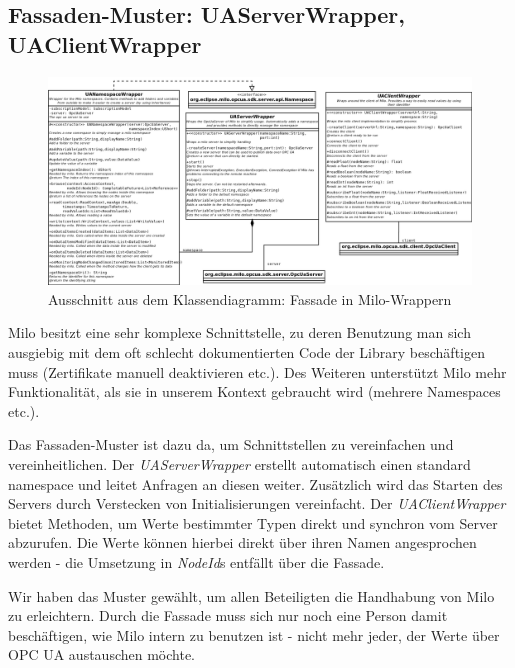 \documentclass[parskip=full]{scrartcl}
\begin{document}
\pagebreak
\subsection{Fassaden-Muster: UAServerWrapper, UAClientWrapper}
\begin{figure}[H]
  \centering
  \includegraphics[scale=0.3]{design/pattern-screenshots/fascade-UAWrapper.png}
  \caption{Ausschnitt aus dem Klassendiagramm: Fassade in Milo-Wrappern}
\end{figure}
Milo besitzt eine sehr komplexe Schnittstelle, zu deren Benutzung man sich ausgiebig mit dem oft schlecht dokumentierten Code
der Library beschäftigen muss (Zertifikate manuell deaktivieren etc.). Des Weiteren unterstützt Milo mehr Funktionalität,
als sie in unserem Kontext gebraucht wird (mehrere Namespaces etc.).

Das Fassaden-Muster ist dazu da, um Schnittstellen zu vereinfachen und vereinheitlichen.
Der \emph{UAServerWrapper} erstellt automatisch einen standard namespace und leitet Anfragen an
diesen weiter. Zusätzlich wird das Starten des Servers durch Verstecken von Initialisierungen vereinfacht. Der \emph{UAClientWrapper}
bietet Methoden, um Werte bestimmter Typen direkt und synchron vom Server abzurufen. Die Werte können hierbei direkt über ihren
Namen angesprochen werden - die Umsetzung in \emph{NodeId}s entfällt über die Fassade.

Wir haben das Muster gewählt, um allen
Beteiligten die Handhabung von Milo zu erleichtern. Durch die Fassade muss sich nur noch eine Person damit beschäftigen, wie
Milo intern zu benutzen ist - nicht mehr jeder, der Werte über OPC UA austauschen möchte.

\pagebreak
\end{document}
